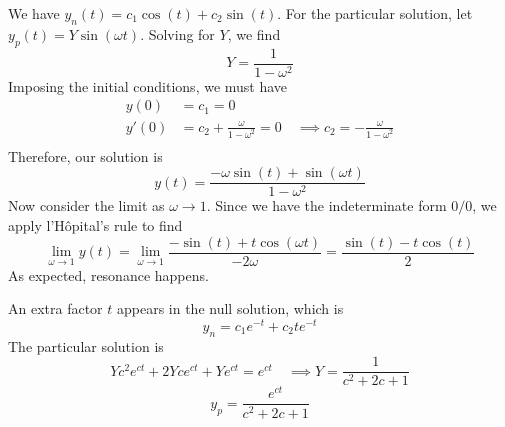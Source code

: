 \documentclass[a4paper]{article}
\begin{document}
We have \( y_{n }\!\left( t  \right) = c_{1}\cos\!\left( t \right) + c_{2}\sin\!\left( t \right) \). For the particular solution, let \( y_{p }\!\left( t  \right) = Y \sin\!\left( \omega t \right)  \). Solving for \( Y \), we find
\[
	Y = \frac{1}{1 - \omega^{2}} 
\]
Imposing the initial conditions, we must have
\begin{align*}
	y \!\left( 0 \right) & = c_{1} = 0 \\
	y'\!\left( 0 \right) & = c_{2} + \frac{\omega}{1 - \omega^{2}} = 0 \quad \implies c_{2} = -\frac{\omega}{1 - \omega^{2}} \\ 
\end{align*}
Therefore, our solution is
\[
	y \!\left( t  \right) = \frac{-\omega \sin\!\left( t \right) + \sin\!\left(\omega t \right) }{1 - \omega^{2}}
\]
Now consider the limit as \( \omega \rightarrow 1 \). Since we have the indeterminate form \( 0 / 0 \), we apply l'H\^opital's rule to find
\[
	\lim\limits_{\omega \to 1} y \!\left( t \right) = \lim\limits_{\omega \to 1} \frac{-\sin\!\left( t \right) + t \cos\!\left( \omega t \right) }{-2 \omega} = \frac{\sin\!\left( t \right)  - t \cos\!\left( t \right) }{2}
\]
As expected, resonance happens.

\vspace{12pt}


An extra factor \( t  \) appears in the null solution, which is
\[
	y_{n } = c_{1} e^{-t } + c_{2}te^{-t}
\]
The particular solution is
\[
	Yc^{2}e^{ct } + 2Yce^{ct } + Ye^{ct } = e^{ct } \quad \implies Y = \frac{1}{c^{2} + 2c + 1} 
\]
\[
	y_{p } = \frac{e^{ct }}{c^{2} + 2c + 1} 
\]

\end{document}
